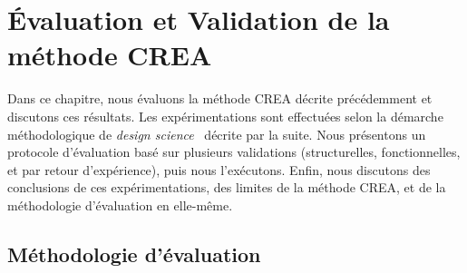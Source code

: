 \chapter{Évaluation et Validation de la méthode CREA}
\label{chapter:Evaluation}

Dans ce chapitre, nous évaluons la méthode CREA décrite précédemment et discutons ces résultats.
Les expérimentations sont effectuées selon la démarche méthodologique de \textit{design science}~\cite{hevner2004design}\cite{hevner2007three} décrite par la suite.
Nous présentons un protocole d'évaluation basé sur plusieurs validations (structurelles, fonctionnelles, et par retour d'expérience), puis nous l'exécutons.
Enfin, nous discutons des conclusions de ces expérimentations, des limites de la méthode CREA, et de la méthodologie d'évaluation en elle-même.


\bigskip

\minitoc %

\newpage


\section{Méthodologie d'évaluation}
\label{section:Evaluation:MethodologieEvaluation}

